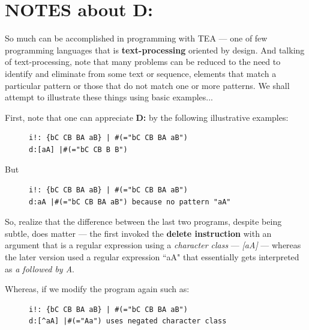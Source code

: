 \documentclass[a4paper, 18pt]{book} %
\begin{document}
\section{NOTES about D:}
\label{SECNOTESD} 


So much can be accomplished in programming with TEA --- one of few programming languages that is \textbf{text-processing} oriented by design. And talking of text-processing, note that many problems can be reduced to the need to identify and eliminate from some text or sequence, elements that match a particular pattern or those that do not match one or more patterns. We shall attempt to illustrate these things using basic examples...

First, note that one can appreciate \textbf{D:} by the following illustrative examples:


\begin{figure}[H]
 \Large
  \centering
  \begin{tcolorbox}[teaterminalstyle, title=TEA Program: delete all instances of `a' or `A']
  \begin{lstlisting}[language=TEA]
i!: {bC CB BA aB} | #(="bC CB BA aB")
d:[aA] |#(="bC CB B B")
   \end{lstlisting}
  \end{tcolorbox}
\end{figure}

But 


\begin{figure}[H]
 \Large
  \centering
  \begin{tcolorbox}[teaterminalstyle, title=TEA Program: delete all instances of `aA']
  \begin{lstlisting}[language=TEA]
i!: {bC CB BA aB} | #(="bC CB BA aB")
d:aA |#(="bC CB BA aB") because no pattern "aA"
   \end{lstlisting}
  \end{tcolorbox}
\end{figure}


So, realize that the difference between the last two programs, despite being subtle, does matter --- the first invoked the \textbf{delete instruction} with an argument that is a regular expression using a \textit{character class} --- \textit{[aA]} --- whereas the later version used a regular expression ``aA" that essentially gets interpreted as \textit{a followed by A}.

Whereas, if we modify the program again such as:

\begin{figure}[H]
 \Large
  \centering
  \begin{tcolorbox}[teaterminalstyle, title=TEA Program: delete all instances NOT `a' or `A']
  \begin{lstlisting}[language=TEA]
i!: {bC CB BA aB} | #(="bC CB BA aB")
d:[^aA] |#(="Aa") uses negated character class
   \end{lstlisting}
  \end{tcolorbox}
\end{figure}
\end{document}
